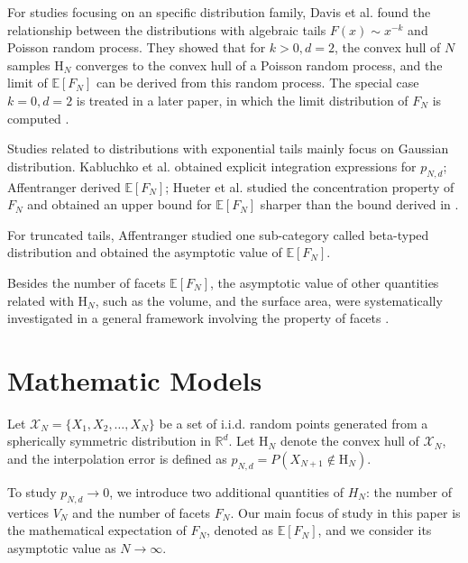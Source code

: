 \documentclass[conference,a4paper]{IEEEtran}
\def\E{\mathbb{E}}
\begin{document}
For studies focusing on an specific distribution family,
Davis et al. \cite{davis1987convex} found the relationship
between the distributions with algebraic tails $F(x) \sim x^{-k}$ and Poisson random process.
They showed that for $k>0, d=2$,
the convex hull of $N$ samples $\mathrm{H}_N$ converges to the convex hull of a Poisson random process,
and
the limit of $\E[F_N]$ can be derived from this random process.
The special case $k=0, d=2$ is treated in a later paper, in which the
limit distribution of $F_N$ is computed \cite{aldous1991number}.

Studies related to distributions with exponential tails mainly focus on Gaussian distribution.
Kabluchko et al. \cite{kabluchko2020absorption} obtained explicit integration expressions for $p_{N,d}$;
Affentranger \cite{affentranger1991convex} derived $\E[F_N]$;
Hueter et al. \cite{hueter1999limit} studied the concentration property of $F_N$ and obtained
an upper bound for $\E[F_N]$ sharper than the bound derived in \cite{dwyer1991convex}.

For truncated tails,
Affentranger \cite{affentranger1991convex} studied one sub-category called beta-typed distribution and obtained
the asymptotic value of $\E[F_N]$.

Besides the number of facets $\E[F_N]$,
the asymptotic value of other quantities related with $\mathrm{H}_N$, such as the volume, and the surface area,
were systematically investigated in a general framework involving the property of facets
\cite{schneider2008stochastic, barany2008random}.

\section{Mathematic Models}
\label{sec:int_f}

Let $\mathcal{X}_N = \{X_1, X_2, \dots, X_N\}$ be a set of i.i.d. random points generated from
a spherically symmetric distribution in $\mathbb{R}^d$.
Let $\mathrm{H}_N$ denote the convex hull of $\mathcal{X}_N$,
and the interpolation error is defined as $p_{N,d}=P(X_{N+1} \not\in \mathrm{H}_N)$.

To study $p_{N,d} \to 0$, we introduce two additional quantities of $H_N$: the number of vertices
$V_N$ and the number of facets $F_N$.
Our main focus of study in this paper is the mathematical expectation
of $F_N$, denoted as $\E[F_N]$, and we consider its asymptotic value as $N\to \infty$.
\end{document}
